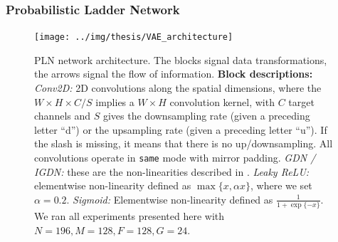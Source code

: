 \documentclass{article}
\begin{document}
\subsubsection{Probabilistic Ladder Network}
\label{sec:prob_ladder_networks}

\begin{figure}
  \centering
  \texttt{[image: ../img/thesis/VAE\_architecture]}
  \caption{PLN network architecture. The blocks signal data transformations, the
    arrows signal the flow of information. \textbf{Block descriptions:}
    \textit{Conv2D:} 2D convolutions along the spatial dimensions, where the
    $W\times H \times C / S$ implies a $W \times H$ convolution kernel, with $C$
  target channels and $S$ gives the downsampling rate (given a preceding letter
  ``d'') or the upsampling rate (given a preceding letter ``u''). If the slash
  is missing, it means that there is no up/downsampling. All convolutions operate
  in \texttt{same} mode with mirror padding. \textit{GDN / IGDN:} these are the
  non-linearities described in \cite{balle2016end}. \textit{Leaky ReLU:}
  elementwise non-linearity defined as $\max\{x, \alpha x\}$, where we set
  $\alpha=0.2$. \textit{Sigmoid:} Elementwise non-linearity defined as
  $\frac{1}{1 + \exp\{-x\}}$. We ran all
  experiments presented here with $N = 196, M = 128, F = 128, G = 24$.}
  \label{fig:pln_architecture}
\end{figure}
\end{document}
